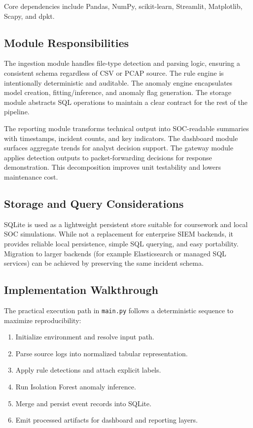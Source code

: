 \documentclass[conference]{IEEEtran}
\begin{document}
Core dependencies include Pandas, NumPy, scikit-learn, Streamlit, Matplotlib, Scapy, and dpkt.

\subsection{Module Responsibilities}
The ingestion module handles file-type detection and parsing logic, ensuring a consistent schema regardless of CSV or PCAP source. The rule engine is intentionally deterministic and auditable. The anomaly engine encapsulates model creation, fitting/inference, and anomaly flag generation. The storage module abstracts SQL operations to maintain a clear contract for the rest of the pipeline.

The reporting module transforms technical output into SOC-readable summaries with timestamps, incident counts, and key indicators. The dashboard module surfaces aggregate trends for analyst decision support. The gateway module applies detection outputs to packet-forwarding decisions for response demonstration. This decomposition improves unit testability and lowers maintenance cost.

\subsection{Storage and Query Considerations}
SQLite is used as a lightweight persistent store suitable for coursework and local SOC simulations. While not a replacement for enterprise SIEM backends, it provides reliable local persistence, simple SQL querying, and easy portability. Migration to larger backends (for example Elasticsearch or managed SQL services) can be achieved by preserving the same incident schema.

\subsection{Implementation Walkthrough}
The practical execution path in \texttt{main.py} follows a deterministic sequence to maximize reproducibility:
\begin{enumerate}
    \item Initialize environment and resolve input path.
    \item Parse source logs into normalized tabular representation.
    \item Apply rule detections and attach explicit labels.
    \item Run Isolation Forest anomaly inference.
    \item Merge and persist event records into SQLite.
    \item Emit processed artifacts for dashboard and reporting layers.
\end{enumerate}
\end{document}
